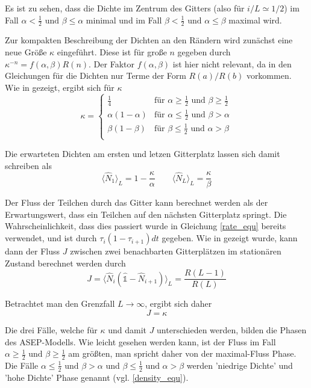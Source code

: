 \documentclass[10pt,a4paper]{report}
\begin{document}
Es ist zu sehen, dass die Dichte im Zentrum des Gitters (also für $i/L\simeq 1/2$) im Fall $\alpha<\frac{1}{2}\text{ und }\beta\leq\alpha$ minimal und im Fall $\beta<\frac{1}{2}\text{ und }\alpha\leq\beta$ maximal wird. 

Zur kompakten Beschreibung der Dichten an den Rändern wird zunächst eine neue Größe $\kappa$ eingeführt. Diese ist für große $n$ gegeben durch $\kappa^{-n}=f(\alpha,\beta)R(n)$. Der Faktor $f(\alpha,\beta)$ ist hier nicht relevant, da in den Gleichungen für die Dichten nur Terme der Form $R(a)/R(b)$ vorkommen. Wie in \cite{ASEP} gezeigt, ergibt sich für $\kappa$
\begin{equation}
\kappa=
\begin{cases}
\frac{1}{4}&\text{für }\alpha\geq\frac{1}{2}\text{ und }\beta\geq\frac{1}{2}\\
\alpha(1-\alpha)&\text{für }\alpha\leq\frac{1}{2}\text{ und }\beta>\alpha\\
\beta(1-\beta)&\text{für }\beta\leq\frac{1}{2}\text{ und }\alpha>\beta\\
\end{cases}
\end{equation}

Die erwarteten Dichten am ersten und letzen Gitterplatz lassen sich damit schreiben als
\begin{equation}
\langle\hat{N}_1\rangle_L=1-\frac{\kappa}{\alpha} \qquad \langle\hat{N}_L\rangle_L=\frac{\kappa}{\beta}
\end{equation}

Der Fluss der Teilchen durch das Gitter kann berechnet werden als der Erwartungswert, dass ein Teilchen auf den nächsten Gitterplatz springt. Die Wahrscheinlichkeit, dass dies passiert wurde in Gleichung \ref{rate_equ} bereits verwendet, und ist durch $\tau_i(1-\tau_{i+1})dt$ gegeben. Wie in \cite{ASEP} gezeigt wurde, kann dann der Fluss $J$ zwischen zwei benachbarten Gitterplätzen im stationären Zustand berechnet werden durch
\begin{equation}
J=\langle\hat{N}_i(\hat{\mathbb{1}}-\hat{N}_{i+1})\rangle_L=\frac{R(L-1)}{R(L)}
\end{equation}

Betrachtet man den Grenzfall $L\rightarrow\infty$, ergibt sich daher
\begin{equation}
J=\kappa
\end{equation}

Die drei Fälle, welche für $\kappa$ und damit $J$ unterschieden werden, bilden die Phasen des ASEP-Modells. Wie leicht gesehen werden kann, ist der Fluss im Fall $\alpha\geq\frac{1}{2}\text{ und }\beta\geq\frac{1}{2}$ am größten, man spricht daher von der maximal-Fluss Phase. Die Fälle $\alpha\leq\frac{1}{2}\text{ und }\beta>\alpha$ und $\beta\leq\frac{1}{2}\text{ und }\alpha>\beta$ werden 'niedrige Dichte' und 'hohe Dichte' Phase genannt (vgl. \ref{density_equ}). 
\end{document}

